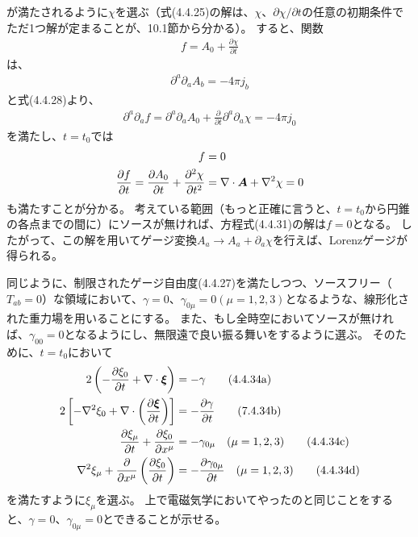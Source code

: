 \documentclass[a4paper]{jsarticle}
\def\vec#1{\mbox{\boldmath $#1$}}
\newcommand{\pdif}[2]{\frac{\partial #1}{\partial #2}}
\begin{document}
が満たされるように$\chi$を選ぶ（式(4.4.25)の解は、$\chi$、$\partial \chi / \partial t$の任意の初期条件でただ1つ解が定まることが、10.1節から分かる）。
すると、関数
\begin{align}
	f = A_0 + \pdif{\chi}{t}
\end{align}
は、
\begin{align}
	\partial^a \partial_a A_b = -4\pi j_b \tag{4.2.32}
\end{align}
と式(4.4.28)より、
\begin{align}
	\partial^a \partial_a f = \partial^a \partial_a A_0 + \pdif{}{t} \partial^a \partial_a \chi = -4 \pi j_0 \tag{4.4.31}
\end{align}
を満たし、$t=t_0$では
\begin{align}
	f &= 0 \\
	\pdif{f}{t} = \pdif{A_0}{t} + \pdif{^2 \chi}{t^2}
	&= \nabla \cdot \vec{A} + \nabla^2 \chi = 0
\end{align}
も満たすことが分かる。
考えている範囲（もっと正確に言うと、$t=t_0$から円錐の各点までの間に）にソースが無ければ、方程式(4.4.31)の解は$f=0$となる。
したがって、この解を用いてゲージ変換$A_a \to A_a + \partial_a \chi$を行えば、Lorenzゲージが得られる。

同じように、制限されたゲージ自由度(4.4.27)を満たしつつ、ソースフリー（$T_{ab}=0$）な領域において、$\gamma=0$、$\gamma_{0\mu}=0 (\mu=1,2,3)$となるような、線形化された重力場を用いることにする。
また、もし全時空においてソースが無ければ、$\gamma_{00}=0$となるようにし、無限遠で良い振る舞いをするように選ぶ。
そのために、$t=t_0$において
\begin{align}
	2 \left( -\pdif{\xi_0}{t} + \nabla \cdot \vec{\xi} \right) &= -\gamma \tag{4.4.34a} \\
	2 \left[ -\nabla^2 \xi_0 + \nabla \cdot \left( \pdif{\vec{\xi}}{t} \right)\right] &= -\pdif{\gamma}{t} \tag{7.4.34b} \\
	\pdif{\xi_{\mu}}{t} + \pdif{\xi_0}{x^{\mu}} &= -\gamma_{0\mu} \quad (\mu=1, 2, 3) \tag{4.4.34c} \\
	\nabla^2 \xi_{\mu} + \pdif{}{x^{\mu}} \left(\pdif{\xi_0}{t}\right) &= -\pdif{\gamma_{0\mu}}{t} \quad (\mu = 1, 2, 3) \tag{4.4.34d}
\end{align}
を満たすように$\xi_{\mu}$を選ぶ。
上で電磁気学においてやったのと同じことをすると、$\gamma=0$、$\gamma_{0\mu}=0$とできることが示せる。
\end{document}
